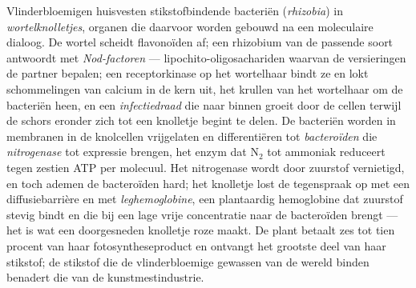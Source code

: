 \begin{definition}\label{def:b3:microbiomes:nodule}
Vlinderbloemigen huisvesten stikstofbindende bacteriën
(\emph{rhizobia}) in \emph{wortelknolletjes}, organen die daarvoor
worden gebouwd na een moleculaire dialoog. De wortel scheidt
flavonoïden af; een rhizobium van de passende soort antwoordt met
\emph{Nod-factoren} --- lipochito-oligosachariden waarvan de
versieringen de partner bepalen; een receptorkinase op het wortelhaar
bindt ze en lokt schommelingen van calcium in de kern uit, het krullen
van het wortelhaar om de bacteriën heen, en een \emph{infectiedraad}
die naar binnen groeit door de cellen terwijl de schors eronder zich
tot een knolletje begint te delen. De bacteriën worden in membranen in
de knolcellen vrijgelaten en differentiëren tot \emph{bacteroïden} die
\emph{nitrogenase} tot expressie brengen, het enzym dat N$_{2}$ tot
ammoniak reduceert tegen zestien ATP per molecuul. Het nitrogenase
wordt door zuurstof vernietigd, en toch ademen de bacteroïden hard; het
knolletje lost de tegenspraak op met een diffusiebarrière en met
\emph{leghemoglobine}, een plantaardig hemoglobine dat zuurstof stevig
bindt en die bij een lage vrije concentratie naar de bacteroïden
brengt --- het is wat een doorgesneden knolletje roze maakt. De plant
betaalt zes tot tien procent van haar fotosyntheseproduct en ontvangt
het grootste deel van haar stikstof; de stikstof die de
vlinderbloemige gewassen van de wereld binden benadert die van de
kunstmestindustrie.
\end{definition}

